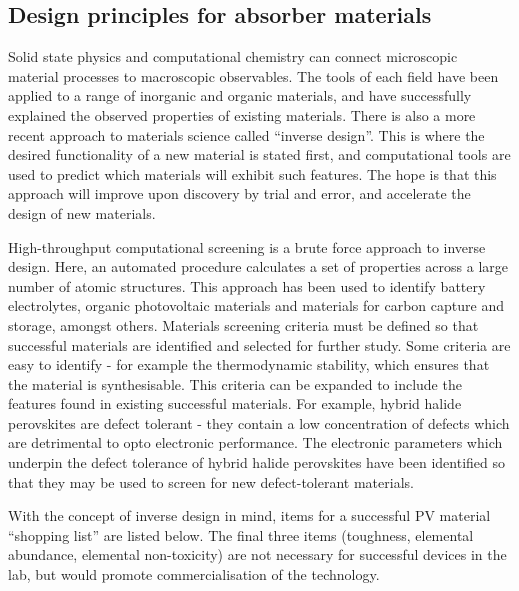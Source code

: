  \subsection{Design principles for absorber materials}
 
Solid state physics and computational chemistry can connect microscopic material processes to macroscopic observables. The tools of each field have been applied to a range of inorganic and organic materials, and have successfully explained the observed properties of existing materials.
There is also a more recent approach to materials science called ``inverse design''. This is where the desired functionality of a new material is stated first, and computational tools are used to predict which materials will exhibit such features.\autocite{Zunger2018}
The hope is that this approach will improve upon discovery by trial and error, and accelerate the design of new materials.

High-throughput computational screening is a brute force approach to inverse design. Here, an automated procedure calculates a set of properties across a large number of atomic structures. This approach has been used to identify battery electrolytes,\autocite{Qu2015} organic photovoltaic materials\autocite{Hachmann2011} and materials for carbon capture and storage,\autocite{Dunstan2016} amongst others. 
Materials screening criteria must be defined so that successful materials are identified and selected for further study. Some criteria are easy to identify - for example the thermodynamic stability, which ensures that the material is synthesisable. This criteria can be expanded to include the features found in existing successful materials. For example, hybrid halide perovskites are defect tolerant - they contain a low concentration of defects which are detrimental to opto electronic performance. The electronic parameters which underpin the defect tolerance of hybrid halide perovskites have been identified so that they may be used to screen for new defect-tolerant materials.\autocite{Brandt2015} 

With the concept of inverse design in mind, items for a successful PV material ``shopping list'' are listed below. The final three items (toughness, elemental abundance, elemental non-toxicity) are not necessary for successful devices in the lab, but would promote commercialisation of the technology.


